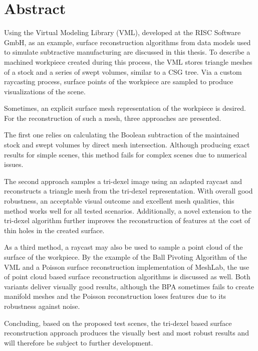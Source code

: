 \pagebreak

\chapter*{Abstract}

Using the Virtual Modeling Library (VML), developed at the RISC Software GmbH, as an example, surface reconstruction algorithms from data models used to simulate subtractive manufacturing are discussed in this thesis.
To describe a machined workpiece created during this process, the VML stores triangle meshes of a stock and a series of swept volumes, similar to a CSG tree.
Via a custom raycasting process, surface points of the workpiece are sampled to produce visualizations of the scene.

Sometimes, an explicit surface mesh representation of the workpiece is desired.
For the reconstruction of such a mesh, three approaches are presented.

The first one relies on calculating the Boolean subtraction of the maintained stock and swept volumes by direct mesh intersection.
Although producing exact results for simple scenes, this method fails for complex scenes due to numerical issues.

The second approach samples a tri-dexel image using an adapted raycast and reconstructs a triangle mesh from the tri-dexel representation.
With overall good robustness, an acceptable visual outcome and excellent mesh qualities, this method works well for all tested scenarios.
Additionally, a novel extension to the tri-dexel algorithm further improves the reconstruction of features at the cost of thin holes in the created surface.

As a third method, a raycast may also be used to sample a point cloud of the surface of the workpiece.
By the example of the Ball Pivoting Algorithm of the VML and a Poisson surface reconstruction implementation of MeshLab, the use of point cloud based surface reconstruction algorithms is discussed as well.
Both variants deliver visually good results, although the BPA sometimes fails to create manifold meshes and the Poisson reconstruction loses features due to its robustness against noise.

Concluding, based on the proposed test scenes, the tri-dexel based surface reconstruction approach produces the visually best and most robust results and will therefore be subject to further development.

